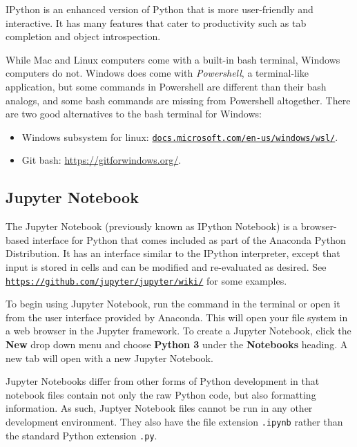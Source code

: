 IPython is an enhanced version of Python that is more user-friendly and interactive.
It has many features that cater to productivity such as tab completion and object introspection.

\begin{info}
While Mac and Linux computers come with a built-in bash terminal, Windows computers do not.
Windows does come with \emph{Powershell}, a terminal-like application, but some commands in Powershell are different than their bash analogs, and some bash commands are missing from Powershell altogether.
There are two good alternatives to the bash terminal for Windows:
\begin{itemize}
\item Windows subsystem for linux: \href{https://docs.microsoft.com/en-us/windows/wsl/install-win10}{\texttt{docs.microsoft.com/en-us/windows/wsl/}}.
\item Git bash: \url{https://gitforwindows.org/}.
\end{itemize}
\end{info}

\subsection*{Jupyter Notebook} %

The Jupyter Notebook (previously known as IPython Notebook) is a browser-based interface for Python that comes included as part of the Anaconda Python Distribution.
It has an interface similar to the IPython interpreter, except that input is stored in cells and can be modified and re-evaluated as desired.
See \href{https://github.com/jupyter/jupyter/wiki/A-gallery-of-interesting-Jupyter-Notebooks}{\texttt{https://github.com/jupyter/jupyter/wiki/}} for some examples.

To begin using Jupyter Notebook, run the command  in the terminal or open it from the user interface provided by Anaconda.
This will open your file system in a web browser in the Jupyter framework.
To create a Jupyter Notebook, click the \textbf{New} drop down menu and choose \textbf{Python 3} under the \textbf{Notebooks} heading.
A new tab will open with a new Jupyter Notebook.

Jupyter Notebooks differ from other forms of Python development in that notebook files contain not only the raw Python code, but also formatting information.
As such, Juptyer Notebook files cannot be run in any other development environment.
They also have the file extension \texttt{.ipynb} rather than the standard Python extension \texttt{.py}.

